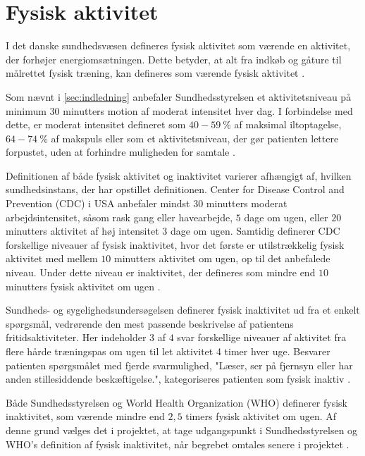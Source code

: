 \section{Fysisk aktivitet}

I det danske sundhedsvæsen defineres fysisk aktivitet som værende en aktivitet, der forhøjer energiomsætningen. Dette betyder, at alt fra indkøb og gåture til målrettet fysisk træning, kan defineres som værende fysisk aktivitet \citep{motionsraad2007, terkelsen2015}.

Som nævnt i \ref{sec:indledning} anbefaler Sundhedsstyrelsen et aktivitetsniveau på minimum 30 minutters motion af moderat intensitet hver dag. I forbindelse med dette, er moderat intensitet defineret som $40-59~\%$ af maksimal iltoptagelse, $64-74~\%$ af makspuls eller som et aktivitetsniveau, der gør patienten lettere forpustet, uden at forhindre muligheden for samtale \citep{motionsraad2007}. 

Definitionen af både fysisk aktivitet og inaktivitet varierer afhængigt af, hvilken sundhedsinstans, der har opstillet definitionen. Center for Disease Control and Prevention (CDC) i USA anbefaler mindst $30$ minutters moderat arbejdsintensitet, såsom rask gang eller havearbejde, $5$ dage om ugen, eller $20$ minutters aktivitet af høj intensitet $3$ dage om ugen. Samtidig definerer CDC forskellige niveauer af fysisk inaktivitet, hvor det første er utilstrækkelig fysisk aktivitet med mellem $10$ minutters aktivitet om ugen, op til det anbefalede niveau. Under dette niveau er inaktivitet, der defineres som mindre end $10$ minutters fysisk aktivitet om ugen \citep{motionsraad2007,christensen2012}.

Sundheds- og sygelighedsundersøgelsen definerer fysisk inaktivitet ud fra et enkelt spørgsmål, vedrørende den mest passende beskrivelse af patientens fritidsaktiviteter. Her indeholder $3$ af $4$ svar forskellige niveauer af aktivitet fra flere hårde træningspas om ugen til let aktivitet 4 timer hver uge. Besvarer patienten spørgsmålet med fjerde svarmulighed, "Læser, ser på fjernsyn eller har anden stillesiddende beskæftigelse.", kategoriseres patienten som fysisk inaktiv \citep{motionsraad2007,christensen2012}.

Både Sundhedsstyrelsen og World Health Organization (WHO) definerer fysisk inaktivitet, som værende mindre end $2,5$ timers fysisk aktivitet om ugen. Af denne grund vælges det i projektet, at tage udgangspunkt i Sundhedsstyrelsen og WHO's definition af fysisk inaktivitet, når begrebet omtales senere i projektet \citep{motionsraad2007}.